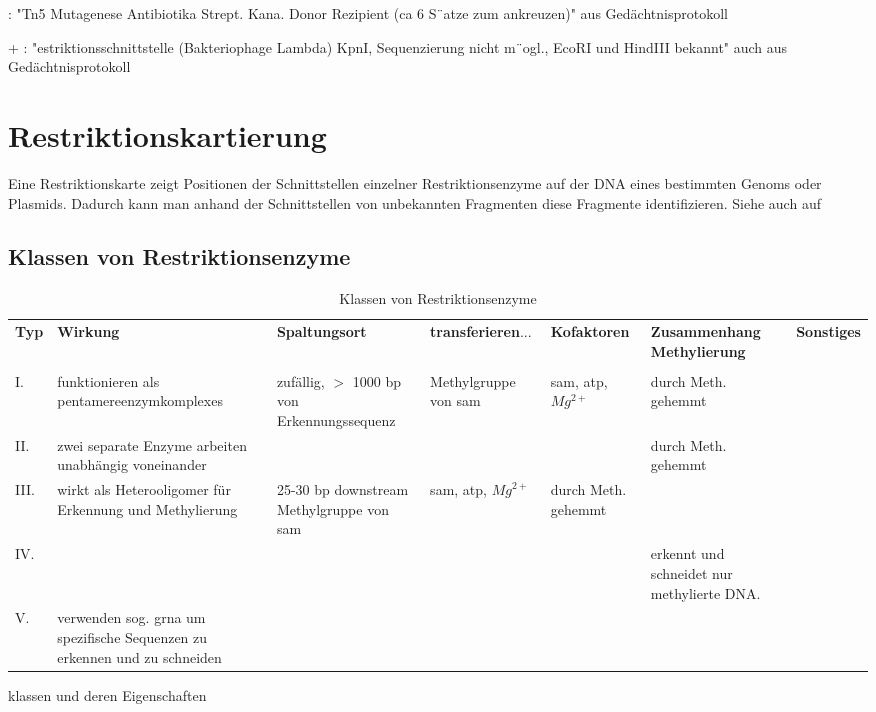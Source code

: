 \todo: "Tn5 Mutagenese Antibiotika Strept. Kana. Donor Rezipient (ca 6 S¨atze zum ankreuzen)" aus Gedächtnisprotokoll

+ \todo: "estriktionsschnittstelle (Bakteriophage Lambda) KpnI, Sequenzierung nicht m¨ogl., EcoRI
und HindIII bekannt" auch aus Gedächtnisprotokoll




\section{Restriktionskartierung} \label{sec:Restriktionskartierung} 
Eine Restriktionskarte zeigt Positionen der Schnittstellen einzelner Restriktionsenzyme auf der DNA eines bestimmten Genoms oder Plasmids. Dadurch kann man anhand der Schnittstellen von unbekannten Fragmenten diese Fragmente identifizieren. 
Siehe auch  auf \pageref{sec:Restriktionsendonuklease}
\subsection{Klassen von Restriktionsenzyme}
\begin{table}
\begin{adjustbox}{angle=90}
    \centering
    \begin{tabular}{p{0.5cm} p{4cm} p{3cm}p{3cm}p{2cm}p{3cm}p{3cm}}
        \textbf{Typ} & \textbf{Wirkung} & \textbf{Spaltungsort} & \textbf{transferieren}... & \textbf{Kofaktoren} & \textbf{Zusammenhang Methylierung} & \textbf{Sonstiges} \\ \\
        I. & funktionieren als \glspl{pentamereenzymkomplexe} & zufällig, $>$ 1000 bp von Erkennungssequenz & Methylgruppe von \gls{sam} & \gls{sam}, \gls{atp}, $Mg^{2+}$  & durch Meth. gehemmt \\
        II. & zwei separate Enzyme arbeiten unabhängig voneinander &  & & & durch Meth. gehemmt   \\
        III. & wirkt als Heterooligomer für Erkennung und Methylierung & 25-30 bp downstream Methylgruppe von \gls{sam} & \gls{sam}, \gls{atp}, ${Mg}^{2+}$ & durch Meth. gehemmt \\
        IV. &  &  & & & erkennt und schneidet nur methylierte DNA.\\
        V. &  verwenden sog. \gls{grna} um spezifische Sequenzen zu erkennen und zu schneiden 
    \end{tabular}
\end{adjustbox}
    \caption{Klassen von Restriktionsenzyme}
    \label{tab:klassenrestriktionsenzyme}
\end{table}
\todo klassen und deren Eigenschaften
\begin{mechanism}[title=Was sind die Eigenschaften von Restriktionsenzyme der Klasse II?]
\todo
\end{mechanism}

